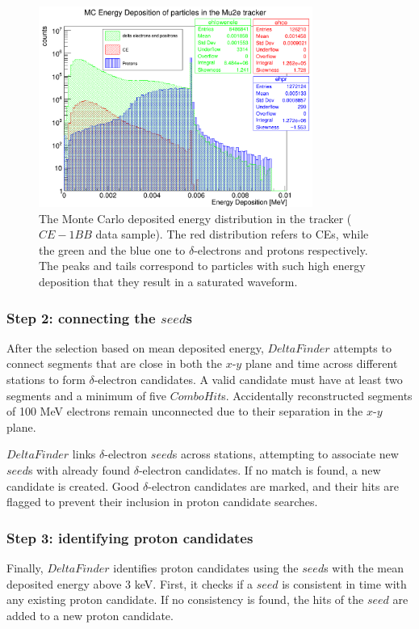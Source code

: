\begin{figure}[!h]
    \centering
    \includegraphics[width =0.8\textwidth]{figures/png/Screenshot_20240729_151910.png}
\caption[Monte Carlo deposited energy 
distribution in the tracker.]{
   The Monte Carlo deposited energy 
   distribution in the tracker ($CE-1BB$ data sample).  
   The red distribution refers to 
   CEs, while the 
   green and the blue one to $\delta$-electrons 
   and protons respectively. 
   The peaks and tails correspond to 
   particles with such high energy 
   deposition that they result in a 
   saturated waveform.
}
   \label{fig:energydeposited}
\end{figure}
\subsubsection{Step 2: connecting the $seed$s}
After the selection based on mean deposited energy, 
$DeltaFinder$ attempts to connect segments that 
are close in both the $x$-$y$ plane and time 
across different stations to form $\delta$-electron 
candidates. A valid candidate must have at 
least two segments and a minimum of five $ComboHit$s. 
Accidentally reconstructed segments of 100 MeV electrons  
remain unconnected due 
to their separation in the $x$-$y$ plane. 

$DeltaFinder$ links $\delta$-electron $seed$s 
across stations, attempting to associate new $seed$s 
with already found $\delta$-electron candidates.
If no match is 
found, a new candidate is created. Good $\delta$-electron 
candidates are marked, and their hits are 
flagged to prevent their inclusion in proton candidate searches.

\subsubsection{Step 3: identifying proton candidates}
Finally, $DeltaFinder$ identifies proton candidates 
using the $seed$s with the mean deposited energy above 3 keV. First, it checks 
if a $seed$ is consistent in time with any existing 
proton candidate. If no consistency is found, 
the hits of the $seed$ are added to a new proton candidate.


